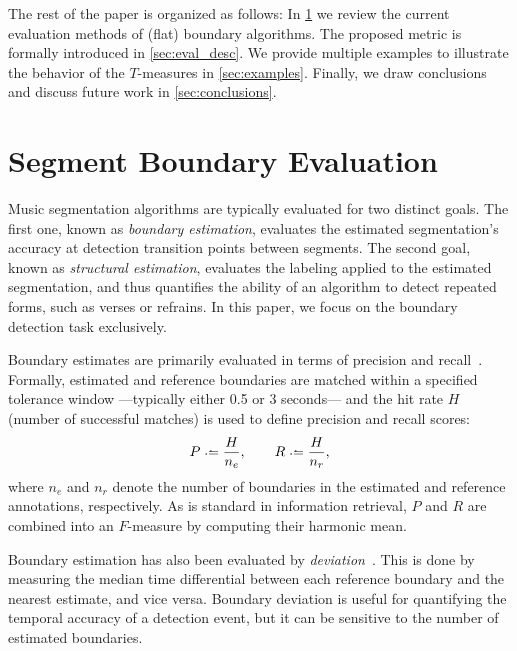 \documentclass{article}
\begin{document}
The rest of the paper is organized as follows:
In \cref{sec:curr_meth} we review the current evaluation methods of (flat) boundary algorithms. 
The proposed metric is formally introduced in \cref{sec:eval_desc}. 
We provide multiple examples to illustrate the behavior of the $T$-measures in \cref{sec:examples}.
Finally, we draw conclusions and discuss future work in \cref{sec:conclusions}.

\section{Segment Boundary Evaluation}\label{sec:curr_meth}

Music segmentation algorithms are typically evaluated for two distinct goals.  
The first one, known as \emph{boundary estimation}, evaluates the estimated segmentation's accuracy at detection transition points between segments.
The second goal, known as \emph{structural estimation}, evaluates the labeling applied to the estimated segmentation, and thus quantifies the ability of an algorithm to detect repeated forms, such as verses or refrains. 
In this paper, we focus on the boundary detection task exclusively.

Boundary estimates are primarily evaluated in terms of precision and recall~\cite{turnbull2007supervised}.
Formally, estimated and reference boundaries are matched within a specified tolerance window ---typically either 0.5 or 3 seconds--- and the hit rate $H$ (number of successful matches) is used to define precision and recall scores:
\begin{equation}
P \defeq \frac{H}{n_e}, \quad\quad R \defeq \frac{H}{n_r},
\end{equation}
where $n_e$ and $n_r$ denote the number of boundaries in the estimated and reference
annotations, respectively.
As is standard in information retrieval, $P$ and $R$ are combined into an $F$-measure by computing their harmonic mean.

Boundary estimation has also been evaluated by \emph{deviation}~\cite{turnbull2007supervised}.
This is done by measuring the median time differential between each reference boundary and the nearest estimate, and vice versa.
Boundary deviation is useful for quantifying the temporal accuracy of a detection event, but it can be sensitive to the number of estimated boundaries.
\end{document}
